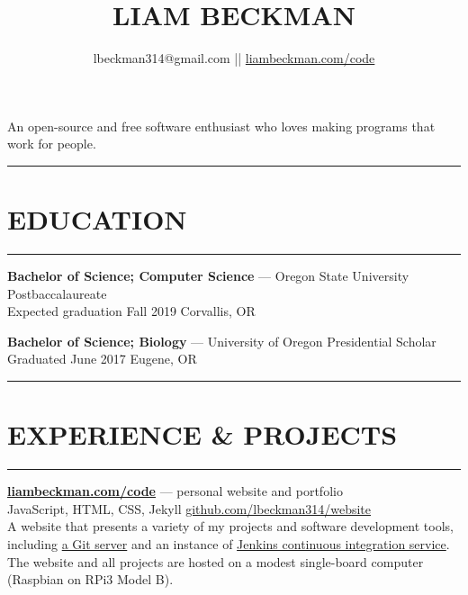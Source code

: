\documentclass[a4paper]{article}
\title{\textcolor{my-red}{LIAM BECKMAN}}
\author{lbeckman314@gmail.com || \href{https://liambeckman.com/code}{liambeckman.com/code}}
\date{\vspace{-5ex}}
\begin{document}
\maketitle

\begin{center}
An open-source and free software enthusiast who loves making programs that work for people.
\end{center}

\textcolor{my-grey}{\rule{\textwidth}{1pt}\vspace{-1.5em}}
\section*{\large{EDUCATION}}\vspace{-1.5em}
\textcolor{my-grey}{\rule{\linewidth}{1pt}}

\medbreak

\textcolor{my-blue}{\textbf{Bachelor of Science; Computer Science}} --- Oregon State University Postbaccalaureate\\
\textcolor{my-grey}{Expected graduation Fall 2019 \hfill Corvallis, OR}

\textcolor{my-grey}{\dotfill}
\medbreak

\textcolor{my-blue}{\textbf{Bachelor of Science; Biology}} --- University of Oregon Presidential Scholar\\
\textcolor{my-grey}{Graduated June 2017 \hfill Eugene, OR}

\medbreak

\textcolor{my-grey}{\rule{\textwidth}{1pt}\vspace{-1.5em}}
\section*{\large{EXPERIENCE \& PROJECTS}}\vspace{-1.5em}
\textcolor{my-grey}{\rule{\linewidth}{1pt}}

\medbreak

\textcolor{my-blue}{\textbf{\href{https://liambeckman.com}{liambeckman.com/code}}} --- personal website and portfolio\\
\textcolor{my-grey}{JavaScript, HTML, CSS, Jekyll \hfill \href{https://github.com/lbeckman314/website}{github.com/lbeckman314/website}}\\

A website that presents a variety of my projects and software development tools, including \href{https://git.liambeckman.com}{a Git server} and an instance of \href{https://liambeckman.com/jenkins}{Jenkins continuous integration service}. The website and all projects are hosted on a modest single-board computer (Raspbian on RPi3 Model B).
\end{document}
